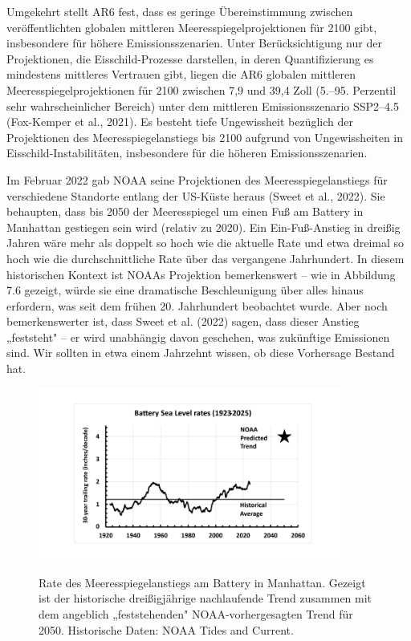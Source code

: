 \documentclass[12pt,paper=a4,DIV=12,parskip=never,chapterprefix=false,headings=standardclasses]{scrreprt}
\begin{document}
Umgekehrt stellt AR6 fest, dass es geringe Übereinstimmung zwischen veröffentlichten globalen mittleren Meeresspiegelprojektionen für 2100 gibt, insbesondere für höhere Emissionsszenarien. Unter Berücksichtigung nur der Projektionen, die Eisschild-Prozesse darstellen, in deren Quantifizierung es mindestens mittleres Vertrauen gibt, liegen die AR6 globalen mittleren Meeresspiegelprojektionen für 2100 zwischen 7,9 und 39,4 Zoll (5.–95. Perzentil sehr wahrscheinlicher Bereich) unter dem mittleren Emissionsszenario SSP2–4.5 (Fox-Kemper et al., 2021). Es besteht tiefe Ungewissheit bezüglich der Projektionen des Meeresspiegelanstiegs bis 2100 aufgrund von Ungewissheiten in Eisschild-Instabilitäten, insbesondere für die höheren Emissionsszenarien.

Im Februar 2022 gab NOAA seine Projektionen des Meeresspiegelanstiegs für verschiedene Standorte entlang der US-Küste heraus (Sweet et al., 2022). Sie behaupten, dass bis 2050 der Meeresspiegel um einen Fuß am Battery in Manhattan gestiegen sein wird (relativ zu 2020). Ein Ein-Fuß-Anstieg in dreißig Jahren wäre mehr als doppelt so hoch wie die aktuelle Rate und etwa dreimal so hoch wie die durchschnittliche Rate über das vergangene Jahrhundert. In diesem historischen Kontext ist NOAAs Projektion bemerkenswert – wie in Abbildung 7.6 gezeigt, würde sie eine dramatische Beschleunigung über alles hinaus erfordern, was seit dem frühen 20. Jahrhundert beobachtet wurde. Aber noch bemerkenswerter ist, dass Sweet et al. (2022) sagen, dass dieser Anstieg „feststeht" – er wird unabhängig davon geschehen, was zukünftige Emissionen sind. Wir sollten in etwa einem Jahrzehnt wissen, ob diese Vorhersage Bestand hat.

\begin{figure}[H]
\begin{center}
\includegraphics[width=0.9\textwidth]{bilder/bilderKlima-0073.png}\\[1cm]
\end{center}
\caption{Rate des Meeresspiegelanstiegs am Battery in Manhattan. Gezeigt ist der historische dreißigjährige nachlaufende Trend zusammen mit dem angeblich „feststehenden" NOAA-vorhergesagten Trend für 2050. Historische Daten: NOAA Tides and Current.}
\end{figure}
\end{document}
